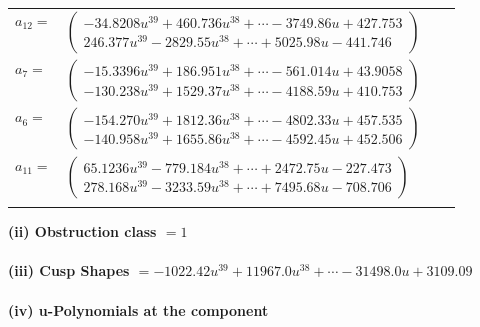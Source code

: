 \documentclass[1p]{elsarticle_modified}
\theoremstyle{definition}
\begin{document}
\begin{tabular}{m{7pt} m{180pt} m{7pt} m{180pt} }
\flushright $a_{12}=$&$\begin{pmatrix}-34.8208 u^{39}+460.736 u^{38}+\cdots-3749.86 u+427.753\\246.377 u^{39}-2829.55 u^{38}+\cdots+5025.98 u-441.746\end{pmatrix}$ \\
\flushright $a_{7}=$&$\begin{pmatrix}-15.3396 u^{39}+186.951 u^{38}+\cdots-561.014 u+43.9058\\-130.238 u^{39}+1529.37 u^{38}+\cdots-4188.59 u+410.753\end{pmatrix}$ \\
\flushright $a_{6}=$&$\begin{pmatrix}-154.270 u^{39}+1812.36 u^{38}+\cdots-4802.33 u+457.535\\-140.958 u^{39}+1655.86 u^{38}+\cdots-4592.45 u+452.506\end{pmatrix}$ \\
\flushright $a_{11}=$&$\begin{pmatrix}65.1236 u^{39}-779.184 u^{38}+\cdots+2472.75 u-227.473\\278.168 u^{39}-3233.59 u^{38}+\cdots+7495.68 u-708.706\end{pmatrix}$\\&\end{tabular}
\flushleft \textbf{(ii) Obstruction class $= 1$}\\~\\
\flushleft \textbf{(iii) Cusp Shapes $= -1022.42 u^{39}+11967.0 u^{38}+\cdots-31498.0 u+3109.09$}\\~\\
\newpage\renewcommand{\arraystretch}{1}
\flushleft \textbf{(iv) u-Polynomials at the component}\newline \\
\end{document}
